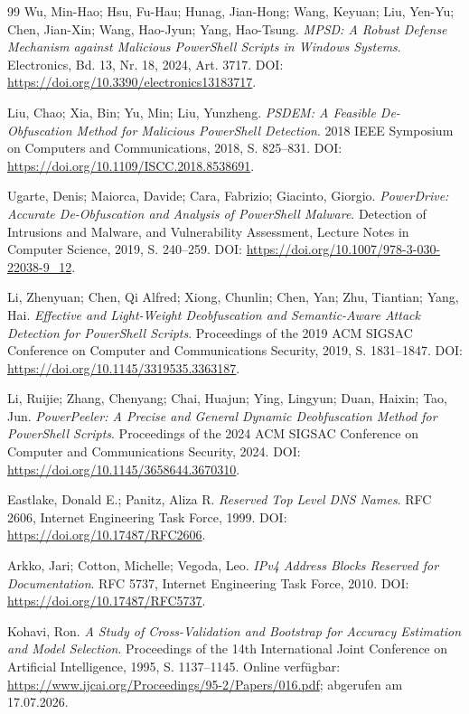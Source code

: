 \documentclass[12pt,a4paper,oneside,parskip=half]{scrreprt}
\begin{document}
\begin{thebibliography}{99}
Wu, Min-Hao; Hsu, Fu-Hau; Hunag, Jian-Hong; Wang, Keyuan; Liu, Yen-Yu; Chen, Jian-Xin; Wang, Hao-Jyun; Yang, Hao-Tsung. \emph{MPSD: A Robust Defense Mechanism against Malicious PowerShell Scripts in Windows Systems}. Electronics, Bd. 13, Nr. 18, 2024, Art. 3717. DOI: \url{https://doi.org/10.3390/electronics13183717}.

Liu, Chao; Xia, Bin; Yu, Min; Liu, Yunzheng. \emph{PSDEM: A Feasible De-Obfuscation Method for Malicious PowerShell Detection}. 2018 IEEE Symposium on Computers and Communications, 2018, S. 825--831. DOI: \url{https://doi.org/10.1109/ISCC.2018.8538691}.

Ugarte, Denis; Maiorca, Davide; Cara, Fabrizio; Giacinto, Giorgio. \emph{PowerDrive: Accurate De-Obfuscation and Analysis of PowerShell Malware}. Detection of Intrusions and Malware, and Vulnerability Assessment, Lecture Notes in Computer Science, 2019, S. 240--259. DOI: \url{https://doi.org/10.1007/978-3-030-22038-9_12}.

Li, Zhenyuan; Chen, Qi Alfred; Xiong, Chunlin; Chen, Yan; Zhu, Tiantian; Yang, Hai. \emph{Effective and Light-Weight Deobfuscation and Semantic-Aware Attack Detection for PowerShell Scripts}. Proceedings of the 2019 ACM SIGSAC Conference on Computer and Communications Security, 2019, S. 1831--1847. DOI: \url{https://doi.org/10.1145/3319535.3363187}.

Li, Ruijie; Zhang, Chenyang; Chai, Huajun; Ying, Lingyun; Duan, Haixin; Tao, Jun. \emph{PowerPeeler: A Precise and General Dynamic Deobfuscation Method for PowerShell Scripts}. Proceedings of the 2024 ACM SIGSAC Conference on Computer and Communications Security, 2024. DOI: \url{https://doi.org/10.1145/3658644.3670310}.

Eastlake, Donald E.; Panitz, Aliza R. \emph{Reserved Top Level DNS Names}. RFC 2606, Internet Engineering Task Force, 1999. DOI: \url{https://doi.org/10.17487/RFC2606}.

Arkko, Jari; Cotton, Michelle; Vegoda, Leo. \emph{IPv4 Address Blocks Reserved for Documentation}. RFC 5737, Internet Engineering Task Force, 2010. DOI: \url{https://doi.org/10.17487/RFC5737}.

Kohavi, Ron. \emph{A Study of Cross-Validation and Bootstrap for Accuracy Estimation and Model Selection}. Proceedings of the 14th International Joint Conference on Artificial Intelligence, 1995, S. 1137--1145. Online verfügbar: \url{https://www.ijcai.org/Proceedings/95-2/Papers/016.pdf}; abgerufen am 17.07.2026.


\end{thebibliography}
\end{document}
